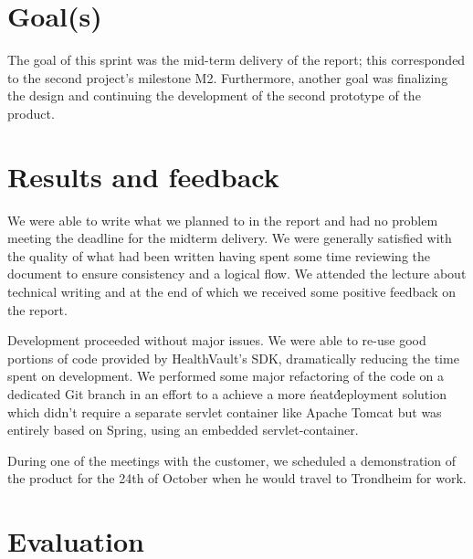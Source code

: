 \fi

\section{Goal(s)}

The goal of this sprint was the mid-term delivery of the report; this corresponded to
the second project's milestone M2. Furthermore, another goal was finalizing the design and continuing
the development of the second prototype of the product.%


\section{Results and feedback}

We were able to write what we planned to in the report and had no problem meeting the deadline for the midterm delivery. 
We were generally satisfied with the quality of what had been written having spent some time reviewing the document to ensure consistency and a logical flow.
We attended the lecture about technical writing and at the end of which we received some positive feedback on the report.

Development proceeded without major issues. 
We were able to re-use good portions of code provided by HealthVault's SDK, dramatically reducing the time spent on development.
We performed some major refactoring of the code on a dedicated Git branch in an effort to a achieve a more \'neat\' deployment solution which didn't require a separate servlet container like Apache Tomcat but was entirely based on Spring, using an embedded servlet-container.

During one of the meetings with the customer, we scheduled a demonstration of the product for the 24th of October when he would travel to Trondheim for work.

\section{Evaluation}

